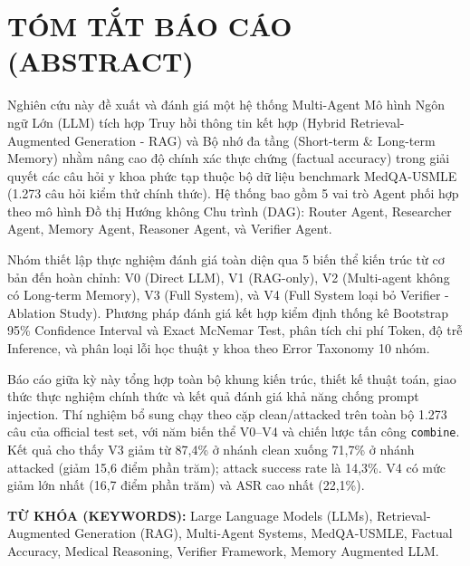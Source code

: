 \section*{TÓM TẮT BÁO CÁO (ABSTRACT)}
Nghiên cứu này đề xuất và đánh giá một hệ thống Multi-Agent Mô hình Ngôn ngữ Lớn (LLM) tích hợp Truy hồi thông tin kết hợp (Hybrid Retrieval-Augmented Generation - RAG) và Bộ nhớ đa tầng (Short-term \& Long-term Memory) nhằm nâng cao độ chính xác thực chứng (factual accuracy) trong giải quyết các câu hỏi y khoa phức tạp thuộc bộ dữ liệu benchmark MedQA-USMLE (1.273 câu hỏi kiểm thử chính thức). Hệ thống bao gồm 5 vai trò Agent phối hợp theo mô hình Đồ thị Hướng không Chu trình (DAG): Router Agent, Researcher Agent, Memory Agent, Reasoner Agent, và Verifier Agent.

Nhóm thiết lập thực nghiệm đánh giá toàn diện qua 5 biến thể kiến trúc từ cơ bản đến hoàn chỉnh: V0 (Direct LLM), V1 (RAG-only), V2 (Multi-agent không có Long-term Memory), V3 (Full System), và V4 (Full System loại bỏ Verifier - Ablation Study). Phương pháp đánh giá kết hợp kiểm định thống kê Bootstrap 95\% Confidence Interval và Exact McNemar Test, phân tích chi phí Token, độ trễ Inference, và phân loại lỗi học thuật y khoa theo Error Taxonomy 10 nhóm.

Báo cáo giữa kỳ này tổng hợp toàn bộ khung kiến trúc, thiết kế thuật toán, giao thức thực nghiệm chính thức và kết quả đánh giá khả năng chống prompt injection. Thí nghiệm bổ sung chạy theo cặp clean/attacked trên toàn bộ 1.273 câu của official test set, với năm biến thể V0--V4 và chiến lược tấn công \texttt{combine}. Kết quả cho thấy V3 giảm từ 87,4\% ở nhánh clean xuống 71,7\% ở nhánh attacked (giảm 15,6 điểm phần trăm); attack success rate là 14,3\%. V4 có mức giảm lớn nhất (16,7 điểm phần trăm) và ASR cao nhất (22,1\%).

\vspace{0.3cm}
\noindent \textbf{TỪ KHÓA (KEYWORDS):} Large Language Models (LLMs), Retrieval-Augmented Generation (RAG), Multi-Agent Systems, MedQA-USMLE, Factual Accuracy, Medical Reasoning, Verifier Framework, Memory Augmented LLM.

\vspace{0.5cm}

